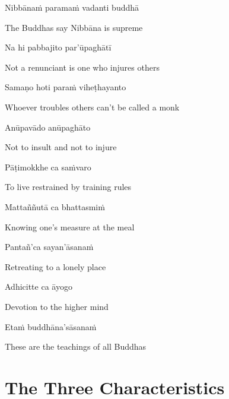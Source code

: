Nibbānaṁ paramaṁ vadanti buddhā

\begin{english}
  The Buddhas say Nibbāna is supreme
\end{english}

Na hi pabbajito par'ūpaghātī

\begin{english}
  Not a renunciant is one who injures others
\end{english}

Samaṇo hoti paraṁ viheṭhayanto

\begin{english}
  Whoever troubles others can't be called a monk
\end{english}

Anūpavādo anūpaghāto

\begin{english}
  Not to insult and not to injure
\end{english}

Pāṭimokkhe ca saṁvaro

\begin{english}
  To live restrained by training rules
\end{english}

Mattaññutā ca bhattasmiṁ

\begin{english}
  Knowing one's measure at the meal
\end{english}

Pantañ'ca sayan'āsanaṁ

\begin{english}
  Retreating to a lonely place
\end{english}

Adhicitte ca āyogo

\begin{english}
  Devotion to the higher mind
\end{english}

Etaṁ buddhāna'sāsanaṁ

\begin{english}
  These are the teachings of all Buddhas
\end{english}

\suttaRef{[Dhp 183-185]}




\section{The Three Characteristics}
\label{three-characteristics}

